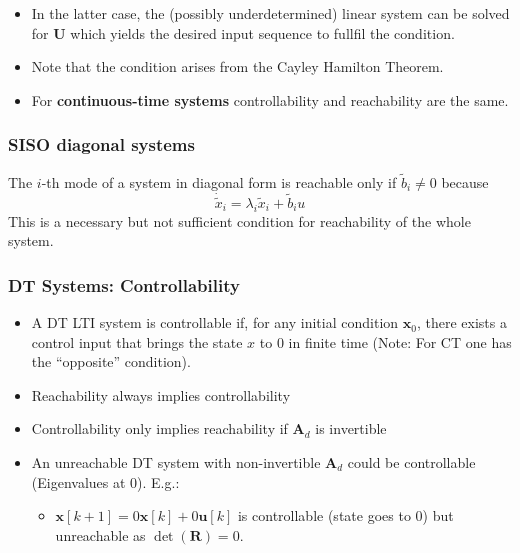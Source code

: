 \newpar{}
\begin{itemize}
    \item In the latter case, the (possibly underdetermined) linear system can be solved for $\mathbf{U}$ which yields the desired input sequence to fullfil the condition. %
    \item Note that the condition arises from the Cayley Hamilton Theorem.
    \item For \textbf{continuous-time systems} controllability and reachability are the same.
\end{itemize}

\subsubsection{SISO diagonal systems}

The $i$-th mode of a system in diagonal form is reachable only if $\tilde{b}_i \neq 0$ because
\begin{equation*}
    \dot{\tilde{x}}_i =\lambda_i\tilde{x}_i+\tilde{b}_i u
\end{equation*}
This is a necessary but not sufficient condition for reachability of the whole system.

\subsubsection{DT Systems: Controllability}

\begin{itemize}
    \item A DT LTI system is controllable if, for any initial condition $\mathbf{x}_0$, there exists a control input that brings the state $x$ to $0$ in finite time (Note: For CT one has the ``opposite'' condition). %
    \item Reachability always implies controllability
    \item Controllability only implies reachability if $\mathbf{A}_d$ is invertible
    \item An unreachable DT system with non-invertible $\mathbf{A}_d$ could be controllable (Eigenvalues at 0). E.g.:
          \begin{itemize}
              \item $\mathbf{x}[k+1] = 0\mathbf{x}[k] + 0\mathbf{u}[k]$ is controllable (state goes to $0$) but unreachable as $\det(\mathbf{R})=0$.
          \end{itemize}
\end{itemize}

